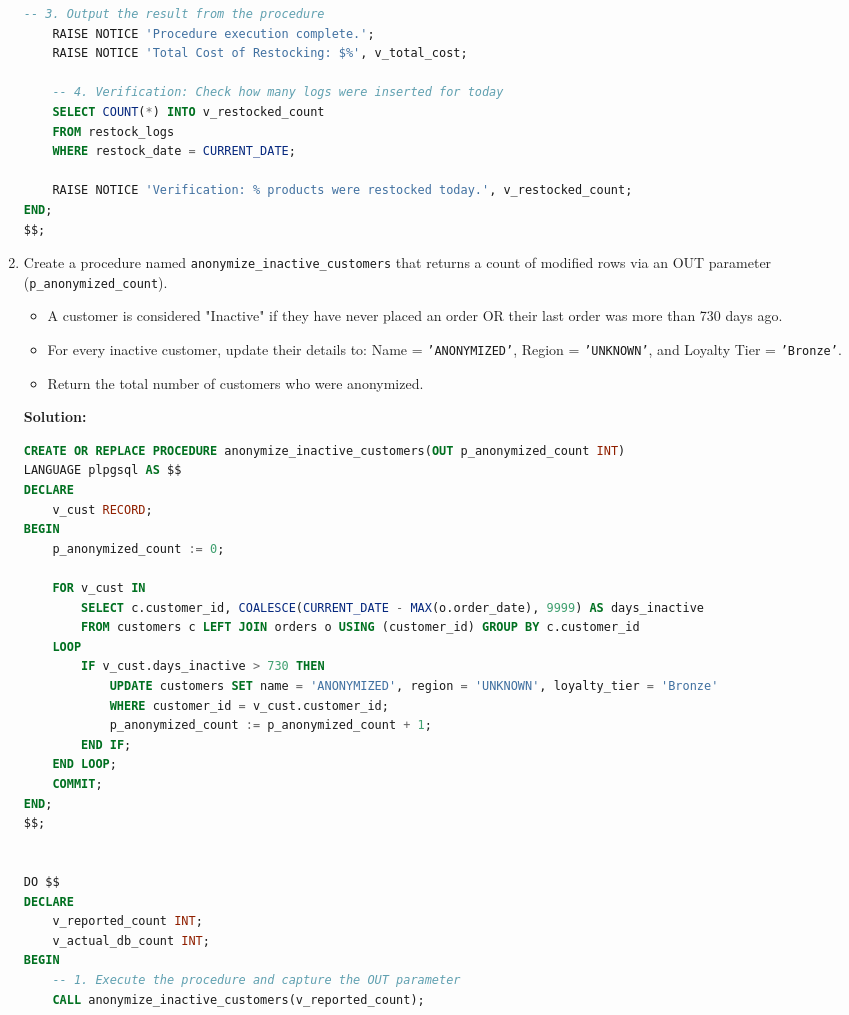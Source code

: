 \documentclass[12pt,a4paper]{article}
\newif\ifshowsolutions
\begin{document}
\begin{enumerate}
\begin{lstlisting}[language=SQL]
    -- 3. Output the result from the procedure
    RAISE NOTICE 'Procedure execution complete.';
    RAISE NOTICE 'Total Cost of Restocking: $%', v_total_cost;

    -- 4. Verification: Check how many logs were inserted for today
    SELECT COUNT(*) INTO v_restocked_count 
    FROM restock_logs 
    WHERE restock_date = CURRENT_DATE;

    RAISE NOTICE 'Verification: % products were restocked today.', v_restocked_count;
END;
$$;
    \end{lstlisting}
    \fi

    \item
    Create a procedure named \texttt{anonymize\_inactive\_customers} that returns a count of modified rows via an OUT parameter (\texttt{p\_anonymized\_count}).
    \begin{itemize}
        \item A customer is considered "Inactive" if they have never placed an order OR their last order was more than 730 days ago.
        \item For every inactive customer, update their details to: Name = \texttt{'ANONYMIZED'}, Region = \texttt{'UNKNOWN'}, and Loyalty Tier = \texttt{'Bronze'}.
        \item Return the total number of customers who were anonymized.
    \end{itemize}

\ifshowsolutions
\textbf{Solution:}
\begin{lstlisting}[language=SQL]
CREATE OR REPLACE PROCEDURE anonymize_inactive_customers(OUT p_anonymized_count INT) 
LANGUAGE plpgsql AS $$
DECLARE
    v_cust RECORD;
BEGIN
    p_anonymized_count := 0;

    FOR v_cust IN 
        SELECT c.customer_id, COALESCE(CURRENT_DATE - MAX(o.order_date), 9999) AS days_inactive
        FROM customers c LEFT JOIN orders o USING (customer_id) GROUP BY c.customer_id
    LOOP
        IF v_cust.days_inactive > 730 THEN
            UPDATE customers SET name = 'ANONYMIZED', region = 'UNKNOWN', loyalty_tier = 'Bronze'
            WHERE customer_id = v_cust.customer_id;
            p_anonymized_count := p_anonymized_count + 1;
        END IF;
    END LOOP;
    COMMIT;
END; 
$$;


DO $$
DECLARE
    v_reported_count INT;
    v_actual_db_count INT;
BEGIN
    -- 1. Execute the procedure and capture the OUT parameter
    CALL anonymize_inactive_customers(v_reported_count);
    

\end{lstlisting}
\end{enumerate}
\end{document}
